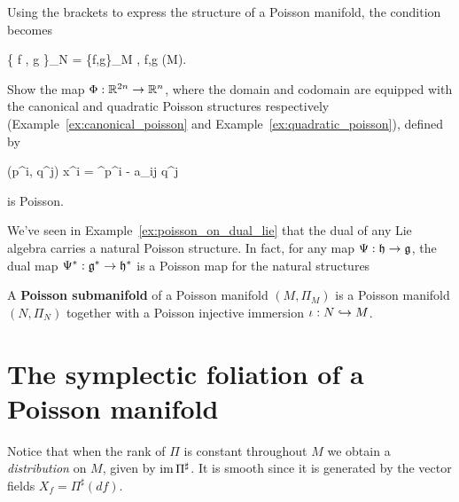 Using the brackets to express the structure of a Poisson manifold, the condition becomes
\begin{eqalign}
	\{ f \circ \phi, g \circ \phi \}_N = \{f,g\}_M \circ \phi, \quad \forall f,g \in \Cinfty(M).
\end{eqalign}

\begin{exercise}
	Show the map $\Phi : \mathbb{R}^{2n} \to \mathbb{R}^n$, where the domain and codomain are equipped with the canonical and quadratic Poisson structures respectively (Example~\ref{ex:canonical_poisson} and Example~\ref{ex:quadratic_poisson}), defined by
	\begin{eqalign}
		(p^i, q^j) \mapsto x^i = \e^{p^i -  a_{ij} q^j}
	\end{eqalign}
	is Poisson.
\end{exercise}
\begin{example}
	We've seen in Example~\ref{ex:poisson_on_dual_lie} that the dual of any Lie algebra carries a natural Poisson structure. In fact, for any map $\Psi : \mathfrak h \to \mathfrak g$, the dual map $\Psi^* : \mathfrak g^* \to \mathfrak h^*$ is a Poisson map for the natural structures
\end{example}

\begin{definition}
	A \textbf{Poisson submanifold} of a Poisson manifold $(M, \Pi_M)$ is a Poisson manifold $(N, \Pi_N)$ together with a Poisson injective immersion $\iota: N \hookrightarrow M$.
\end{definition}

\section{The symplectic foliation of a Poisson manifold}
Notice that when the rank of $\Pi$ is constant throughout $M$ we obtain a \emph{distribution} on $M$, given by $\operatorname{im} \Pi^\sharp$. It is smooth since it is generated by the vector fields $X_f = \Pi^\sharp (df)$.

